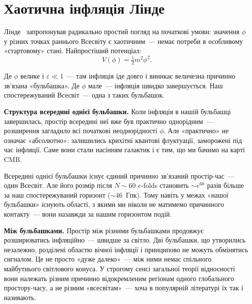\documentclass[12pt, a4paper]{article}
\begin{document}
\section{Хаотична інфляція Лінде}
\label{sec:chaotic}

Лінде~\cite{linde_1983} запропонував радикально простий погляд
на початкові умови: значення $\phi$ у різних точках раннього
Всесвіту є хаотичним~--- немає потреби в особливому «стартовому»
стані. Найпростіший потенціал:
\begin{equation*}
  V(\phi) = \tfrac{1}{2}m^2\phi^2.
\end{equation*}

Де $\phi$ велике і $\varepsilon \ll 1$~--- там інфляція іде довго
і виникає величезна причинно зв'язана «бульбашка». Де $\phi$ мале~---
інфляція швидко завершується. Наш спостережуваний Всесвіт~---
одна з таких бульбашок.

\textbf{Структура всередині однієї бульбашки.} Коли інфляція
в нашій бульбашці завершилась, простір всередині неї вже був
практично однорідним~--- розширення загладило всі початкові
неоднорідності $\phi$. Але «практично» не означає «абсолютно»:
залишились крихітні квантові флуктуації, заморожені під час
інфляції. Саме вони стали насінням галактик і є тим, що ми
бачимо на карті CMB.

Всередині однієї бульбашки існує єдиний причинно зв'язаний
простір-час~--- один Всесвіт. Але його розмір після $N \sim 60$
$e$-folds становить $\sim e^{60}$ разів більше за наш
спостережуваний горизонт ($\sim 46$~Гпк). Тому навіть у
межах «нашої бульбашки» існують області, з якими ми ніколи
не матимемо причинного контакту~--- вони назавжди за
нашим горизонтом подій.

\textbf{Між бульбашками.} Простір між різними бульбашками
продовжує розширюватись інфляційно~--- швидше за світло.
Дві бульбашки, що утворились незалежно, розділені областю
вічної інфляції і принципово не можуть обмінятись сигналом.
Це не просто «дуже далеко»~--- між ними немає спільного
майбутнього світлового конуса. У строгому сенсі загальної теорії відносності вони
належать різним причинно відокремленим регіонам
одного глобального простору-часу, а не різним «всесвітам»~---
хоча в популярній літературі їх так і називають.
\end{document}

